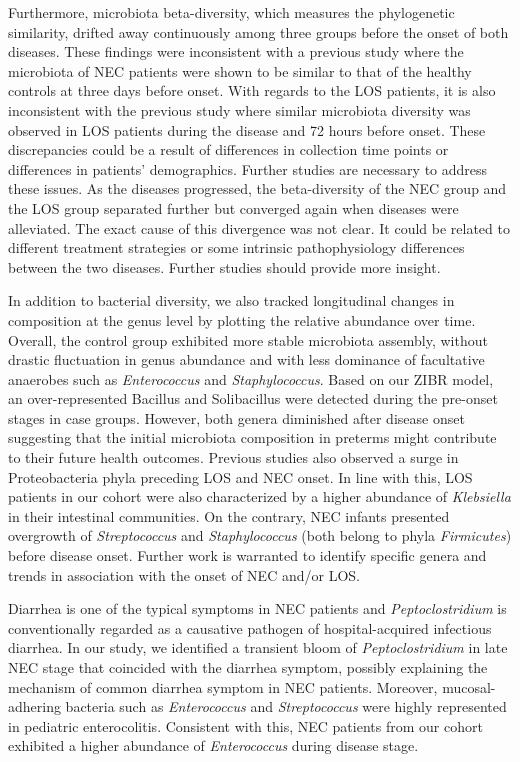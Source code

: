 \documentclass[fleqn,10pt]{wlpeerj} %
\begin{document}
Furthermore, microbiota beta-diversity, which measures the phylogenetic similarity, drifted away continuously among three groups before the onset of both diseases. These findings were inconsistent with a previous study where the microbiota of NEC patients were shown to be similar to that of the healthy controls at three days before onset\citep{mai2011fecal}. With regards to the LOS patients, it is also inconsistent with the previous study where similar microbiota diversity was observed in LOS patients during the disease and 72 hours before onset\citep{mai2013distortions}. These discrepancies could be a result of differences in collection time points or differences in patients’ demographics.  Further studies are necessary to address these issues.  As the diseases progressed, the beta-diversity of the NEC group and the LOS group separated further but converged again when diseases were alleviated. The exact cause of this divergence was not clear. It could be related to different treatment strategies or some intrinsic pathophysiology differences between the two diseases. Further studies should provide more insight.

In addition to bacterial diversity, we also tracked longitudinal changes in composition at the genus level by plotting the relative abundance over time. Overall, the control group exhibited more stable microbiota assembly, without drastic fluctuation in genus abundance and with less dominance of facultative anaerobes such as \textit{Enterococcus} and \textit{Staphylococcus}\citep{gibson2015antibiotics, la2014patterned, grier2017impact}. Based on our ZIBR model, an over-represented Bacillus and Solibacillus were detected during the pre-onset stages in case groups. However, both genera diminished after disease onset suggesting that the initial microbiota composition in preterms might contribute to their future health outcomes. Previous studies also observed a surge in Proteobacteria phyla\citep{mai2013distortions,mai2011fecal} preceding LOS and NEC onset. In line with this, LOS patients in our cohort were also characterized by a higher abundance of \textit{Klebsiella} in their intestinal communities.  On the contrary, NEC infants presented overgrowth of \textit{Streptococcus} and \textit{Staphylococcus} (both belong to phyla \textit{Firmicutes}) before disease onset. Further work is warranted to identify specific genera and trends in association with the onset of NEC and/or LOS.

Diarrhea is one of the typical symptoms in NEC patients and \textit{Peptoclostridium} is conventionally regarded as a causative pathogen of hospital-acquired infectious diarrhea\citep{rodriguez2016clostridium, pereira2016complete}. In our study, we identified a transient bloom of \textit{Peptoclostridium} in late NEC stage that coincided with the diarrhea symptom, possibly explaining the mechanism of common diarrhea symptom in NEC patients.  Moreover, mucosal-adhering bacteria such as \textit{Enterococcus} and \textit{Streptococcus} were highly represented in pediatric enterocolitis\citep{normann2013intestinal, zhou2016increased}. Consistent with this, NEC patients from our cohort exhibited a higher abundance of \textit{Enterococcus} during disease stage.
\end{document}
